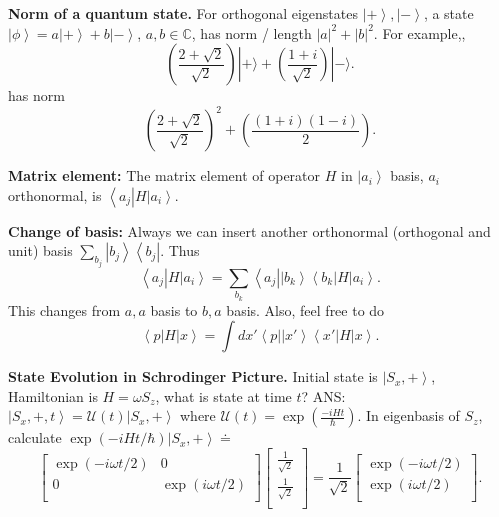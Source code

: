 
\textbf{Norm of a quantum state.} For orthogonal eigenstates $\left| + \right\rangle , \left| - \right\rangle $, a state $\left| \phi \right\rangle = a \left| + \right\rangle  + b \left| - \right\rangle $, $a, b \in \mathbb{C}$, has norm / length $|a|^2 + |b|^2$. For example,,
\[
	\left(\frac{2+\sqrt{2}}{\sqrt{2}}\right)|+\rangle+\left(\frac{1+i}{\sqrt{2}}\right)|-\rangle
.\] 
has norm
\[
	\left(\frac{2+\sqrt{2}}{\sqrt{2}}\right)^2+\left(\frac{(1 + i) ( 1 - i)}{2}\right)
.\]

\textbf{Matrix element:} The matrix element of operator $H$ in $\left| a_i \right\rangle $ basis, $a_i$ orthonormal, is $\left\langle a_j \right| H \left| a_i \right\rangle $.

\textbf{Change of basis:} Always we can insert another orthonormal (orthogonal and unit) basis $\sum_{b_j} \left| b_j \right\rangle \left\langle b_j \right| $. Thus
\[
	\left\langle a_j \right| H \left| a_i \right\rangle 
	= \sum_{b_k}
	\left\langle a_j \right| \left| b_k \right\rangle \left\langle b_k \right|  H \left| a_i \right\rangle 
.\] 
This changes from $a, a$ basis to $b, a$ basis. Also, feel free to do
\[
	\left\langle p \right| H \left| x \right\rangle = \int dx' \left\langle p \right|  \left| x' \right\rangle \left\langle x' \right| H \left| x \right\rangle 
.\] 

\textbf{State Evolution in Schrodinger Picture.} Initial state is $\left| S_x, + \right\rangle $, Hamiltonian is $H = \omega S_z$, what is state at time $t$? ANS: $\left| S_x, +, t \right\rangle = \mathcal{U}(t) \left| S_x, + \right\rangle $ where $\mathcal{U}(t) = \exp\left( \frac{- i H t }{\hbar} \right) $. In eigenbasis of $S_z$, calculate $\exp\left( - i H t /\hbar \right) \left| S_x, + \right\rangle \doteq$
\[
	\begin{bmatrix}
		\exp(- i \omega t / 2) & 0 \\
		0 & \exp(i \omega t / 2) \\
	\end{bmatrix}
	\begin{bmatrix}
		\frac{1}{\sqrt{2} } \\
		\frac{1}{\sqrt{2} } \\
	\end{bmatrix}
	=
	\frac{1}{\sqrt{2} }
	\begin{bmatrix}
		\exp(- i \omega t / 2) \\
		\exp(i \omega t / 2) \\
	\end{bmatrix}
.\] 

